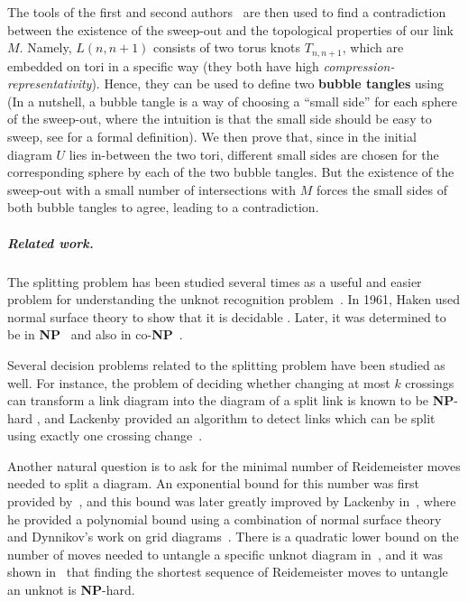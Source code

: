 \documentclass{article}
\begin{document}
The tools of the first and second authors~\cite{Lunel_spherewidth_out} are then used to find a contradiction between the existence of the sweep-out and the topological properties of our link $M$. Namely, $L(n,n+1)$ consists of two torus knots $T_{n,n+1}$, which are embedded on tori in a specific way (they both have high \emph{compression-representativity}). Hence, they can be used to define two \textbf{bubble tangles} using \cite[Theorem~1.2]{Lunel_spherewidth_out} (In a nutshell, a bubble tangle is a way of choosing a ``small side'' for each sphere of the sweep-out, where the intuition is that the small side should be easy to sweep, see  for a formal definition). We then prove that, since in the initial diagram $U$ lies in-between the two tori, different small sides are chosen for the corresponding sphere by each of the two bubble tangles. But the existence of the sweep-out with a small number of intersections with $M$ forces the small sides of both bubble tangles to agree, leading to a contradiction.

\subparagraph*{Related work.}
The splitting problem has been studied several times as a useful and easier problem for understanding the unknot recognition problem~\cite{Dynnikov_arc, Lackenby_Poly_bound}. In 1961, Haken used normal surface theory to show that it is decidable \cite{haken_normal_surface}. Later, it was determined to be in \textbf{NP}~\cite{Hass_trivial_NP} and also in co-\textbf{NP}~\cite[Theorem~1.6]{Lackenby_co-NP}. 

Several decision problems related to the splitting problem have been studied as well. For instance, the problem of deciding whether changing at most $k$ crossings can transform a link diagram into the diagram of a split link is known to be \textbf{NP}-hard \cite{Koenig_hardness}, and Lackenby provided an algorithm to detect links which can be split using exactly one crossing change~\cite{lackenby2021links}. 

Another natural question is to ask for the minimal number of Reidemeister moves needed to split a diagram. An exponential bound for this number was first provided by~\cite{Hayashi_upper_unlink}, and this bound was later greatly improved by Lackenby in~\cite{Lackenby_Poly_bound}, where he provided a polynomial bound using a combination of normal surface theory~\cite{Hass_trivial_NP} and Dynnikov's work on grid diagrams~\cite{Dynnikov_arc}. There is a quadratic lower bound on the number of moves needed to untangle a specific unknot diagram in~\cite{hass2010unknot}, and it was shown in~\cite{unbearable_SoCG, unbearable} that finding the shortest sequence of Reidemeister moves to untangle an unknot is \textbf{NP}-hard.
\end{document}
